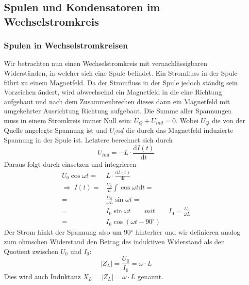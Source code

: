 \documentclass[10pt,a4paper]{article}
\newcommand{\degree}{$^\circ$}
\begin{document}
\subsection{Spulen und Kondensatoren im Wechselstromkreis}

\subsubsection{Spulen in Wechselstromkreisen}
Wir betrachten nun einen Wechselstromkreis mit vernachlässigbaren Widerständen, in welcher sich eine Spule befindet. Ein Stromfluss in der Spule führt zu einem Magnetfeld. Da der Stromfluss in der Spule jedoch ständig sein Vorzeichen ändert, wird abwechselnd ein Magnetfeld in die eine Richtung aufgebaut und nach dem Zusammenbrechen dieses dann ein Magnetfeld mit umgekehrter Ausrichtung Richtung aufgebaut.
Die Summe aller Spannungen muss in einem Stromkreis immer Null sein:
$ U_Q + U_{ind} = 0 $.
Wobei $U_Q$ die von der Quelle angelegte Spannung ist und $U_ind$ die durch das Magnetfeld induzierte Spannung in der Spule ist. Letztere berechnet sich durch
\begin{equation}
U_{ind} = - L \cdot \frac{\mathrm dI(t)}{\mathrm dt}
\end{equation}
Daraus folgt durch einsetzen und integrieren
\begin{align}
U_0 \cos \omega t =& L \cdot \frac{\mathrm dI(t)}{\mathrm dt} \nonumber \\ 
\Rightarrow\; I(t) =& \frac{U_0}{L} \int \cos \omega t \mathrm dt = \nonumber \\ 
=& \frac{U_0}{\omega L} \sin \omega t = \nonumber\\
=& I_0 \sin \omega t \qquad mit\qquad I_0 = \frac{U_0}{\omega L}  \nonumber\\
=& I_0 \cos(\omega t - 90^\circ)
\end{align}
Der Strom hinkt der Spannung also um \unit{90}{\degree} hinterher und wir definieren analog zum ohmschen Widerstand den Betrag des induktiven Widerstand als den Quotient zwischen $U_0$ und $I_0$:
\begin{equation}
\left|Z_L\right| = \frac{U_0}{I_0} = \omega \cdot L
\end{equation}
Dies wird auch Induktanz $X_L = \left|Z_L\right| = \omega \cdot L$ genannt.
\end{document}
